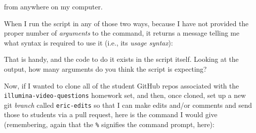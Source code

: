 \documentclass[]{krantz}
\makeatletter
\newenvironment{Shaded}{\begin{snugshade}}{\end{snugshade}}
\newcommand{\ExtensionTok}[1]{#1}
\newcommand{\NormalTok}[1]{#1}
\newenvironment{kframe}{%
\medskip{}
\setlength{\fboxsep}{.8em}
 \def\at@end@of@kframe{}%
 \ifinner\ifhmode%
  \def\at@end@of@kframe{\end{minipage}}%
  \begin{minipage}{\columnwidth}%
 \fi\fi%
 \def\FrameCommand##1{\hskip\@totalleftmargin \hskip-\fboxsep
 \colorbox{shadecolor}{##1}\hskip-\fboxsep
     \hskip-\linewidth \hskip-\@totalleftmargin \hskip\columnwidth}%
 \MakeFramed {\advance\hsize-\width
   \@totalleftmargin\z@ \linewidth\hsize
   \@setminipage}}%
 {\par\unskip\endMakeFramed%
 \at@end@of@kframe}
\renewenvironment{Shaded}{\begin{kframe}}{\end{kframe}}
\makeatother
\begin{document}
from anywhere on my computer.

When I run the script in any of those two ways, because I have not provided the
proper number of \emph{arguments} to the command, it returns a message telling me
what syntax is required to use it (i.e., its \emph{usage syntax}):

\begin{Shaded}
\end{Shaded}

That is handy, and the code to do it exists in the script itself. Looking at the output, how many
arguments do you think the script is expecting?

Now, if I wanted to clone all of the student GitHub repos associated with the \texttt{illumina-video-questions}
homework set, and then, once cloned, set up a new git \emph{branch} called \texttt{eric-edits} so that I can make
edits and/or comments and send those to students via a pull request, here is the command I would give
(remembering, again that the \texttt{\%} signifies the command prompt, here):

\begin{Shaded}
\begin{Highlighting}[]
\ExtensionTok{%
\end{Highlighting}
\end{Shaded}
\end{document}
